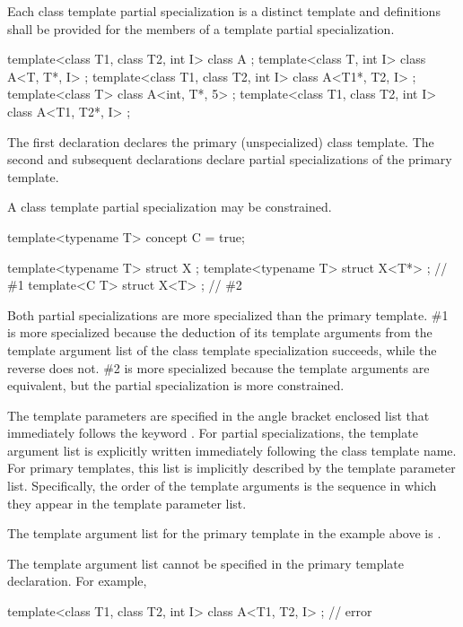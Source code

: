 \pnum
Each class template partial specialization is a distinct template and
definitions shall be provided for the members of a template partial
specialization.

\pnum
\begin{example}
\begin{codeblock}
template<class T1, class T2, int I> class A             { };
template<class T, int I>            class A<T, T*, I>   { };
template<class T1, class T2, int I> class A<T1*, T2, I> { };
template<class T>                   class A<int, T*, 5> { };
template<class T1, class T2, int I> class A<T1, T2*, I> { };
\end{codeblock}

The first declaration declares the primary (unspecialized) class template.
The second and subsequent declarations declare partial specializations of
the primary template.
\end{example}

\pnum
A class template partial specialization may be constrained.
\begin{example}
\begin{codeblock}
template<typename T> concept C = true;

template<typename T> struct X { };
template<typename T> struct X<T*> { };          // \#1
template<C T> struct X<T> { };                  // \#2
\end{codeblock}
Both partial specializations are more specialized than the primary template.
\#1 is more specialized because the deduction of its template arguments
from the template argument list of the class template specialization succeeds,
while the reverse does not.
\#2 is more specialized because the template arguments are equivalent,
but the partial specialization is more constrained.
\end{example}

\pnum
The template parameters are specified in the angle bracket enclosed list
that immediately follows the keyword
.
For partial specializations, the template argument list is explicitly
written immediately following the class template name.
For primary templates, this list is implicitly described by the
template parameter list.
Specifically, the order of the template arguments is the sequence in
which they appear in the template parameter list.
\begin{example}
The template argument list for the primary template in the example
above is
.
\end{example}
\begin{note}
The template argument list cannot be specified in the primary template
declaration.
For example,

\begin{codeblock}
template<class T1, class T2, int I>
class A<T1, T2, I> { };                         // error
\end{codeblock}
\end{note}

